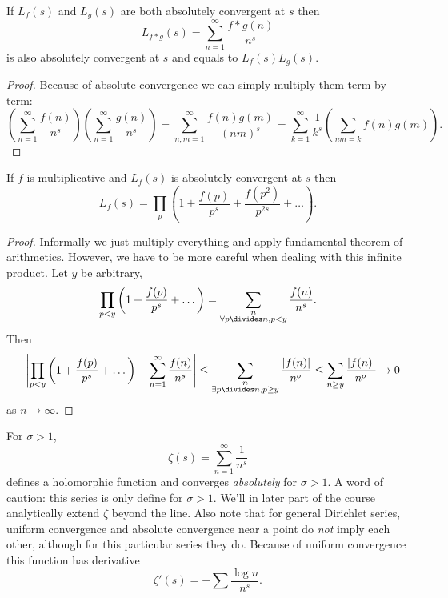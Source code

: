\documentclass[a4paper]{article}
\begin{document}
\begin{lemma}
  If \(L_f(s)\) and \(L_g(s)\) are both absolutely convergent at \(s\) then
  \[
    L_{f * g} (s) = \sum_{n = 1}^\infty \frac{f * g (n)}{n^s}
    \]
    is also absolutely convergent at \(s\) and equals to \(L_f(s) L_g(s)\).
\end{lemma}

\begin{proof}
  Because of absolute convergence we can simply multiply them term-by-term:
  \[
    \left( \sum_{n = 1}^\infty \frac{f(n)}{n^s} \right) \left( \sum_{n = 1}^\infty \frac{g(n)}{n^s} \right)
    = \sum_{n, m = 1}^\infty \frac{f(n) g(m)}{(nm)^s} = \sum_{k = 1}^\infty \frac{1}{k^s} \left( \sum_{nm = k} f(n) g(m) \right).
  \]
\end{proof}

\begin{lemma}
  If \(f\) is multiplicative and \(L_f(s)\) is absolutely convergent at \(s\) then
  \[
    L_f(s) = \prod_p \left( 1 + \frac{f(p)}{p^s} + \frac{f(p^2)}{p^{2s}} + \dots \right).
  \]
\end{lemma}

\begin{proof}
  Informally we just multiply everything and apply fundamental theorem of arithmetics. However, we have to be more careful when dealing with this infinite product. Let \(y\) be arbitrary,
  \[
    \prod_{p < y} \left( 1 + \frac{f(p)}{p^s} + \dots \right)
    = \sum_{\substack{n \\ \forall p \divides n, p < y}} \frac{f(n)}{n^s}.
  \]
  Then
  \[
    \phantom{=} \left| \prod_{p < y} \left( 1 + \frac{f(p)}{p^s} + \dots \right) - \sum_{n = 1}^\infty \frac{f(n)}{n^s} \right|
    \leq \sum_{\substack{n \\ \exists p \divides n, p \geq y}} \frac{|f(n)|}{n^\sigma}
    \leq \sum_{n \geq y} \frac{|f(n)|}{n^\sigma}
    \to 0
  \]
  as \(n \to \infty\).
\end{proof}

For \(\sigma > 1\),
\[
  \zeta(s) = \sum_{n = 1}^\infty \frac{1}{n^s}
\]
defines a holomorphic function and converges \emph{absolutely} for \(\sigma > 1\). A word of caution: this series is only define for \(\sigma > 1\). We'll in later part of the course analytically extend \(\zeta\) beyond the line. Also note that for general Dirichlet series, uniform convergence and absolute convergence near a point do \emph{not} imply each other, although for this particular series they do. Because of uniform convergence this function has derivative
\[
  \zeta'(s) = - \sum \frac{\log n}{n^s}.
\]
\end{document}
